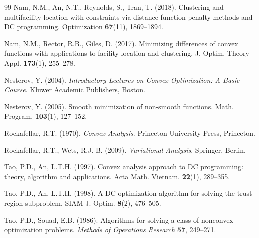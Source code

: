\documentclass[11pt]{article}
\theoremstyle{definition}
\newcommand{\1}{\mathbf{1}}
\begin{document}
\begin{thebibliography}{99}
Nam, N.M., An, N.T., Reynolds, S., Tran, T. (2018). Clustering and multifacility location with constraints via distance function penalty methods and DC programming. Optimization \textbf{67}(11), 1869--1894.

Nam, N.M., Rector, R.B., Giles, D. (2017). Minimizing differences of convex functions with applications to facility location and clustering. J. Optim. Theory Appl. \textbf{173}(1), 255--278.

Nesterov, Y. (2004). \emph{Introductory Lectures on Convex Optimization: A Basic Course}. Kluwer Academic Publishers, Boston.

Nesterov, Y. (2005). Smooth minimization of non-smooth functions. Math. Program. \textbf{103}(1), 127--152.

Rockafellar, R.T. (1970). \emph{Convex Analysis}. Princeton University Press, Princeton.

Rockafellar, R.T., Wets, R.J.-B. (2009). \emph{Variational Analysis}. Springer, Berlin.

Tao, P.D., An, L.T.H. (1997). Convex analysis approach to DC programming: theory, algorithm and applications. Acta Math. Vietnam. \textbf{22}(1), 289--355.

Tao, P.D., An, L.T.H. (1998). A DC optimization algorithm for solving the trust-region subproblem. SIAM J. Optim. \textbf{8}(2), 476--505.

Tao, P.D., Souad, E.B. (1986). Algorithms for solving a class of nonconvex optimization problems. \emph{Methods of Operations Research} \textbf{57}, 249--271.

\end{thebibliography}
\end{document}

